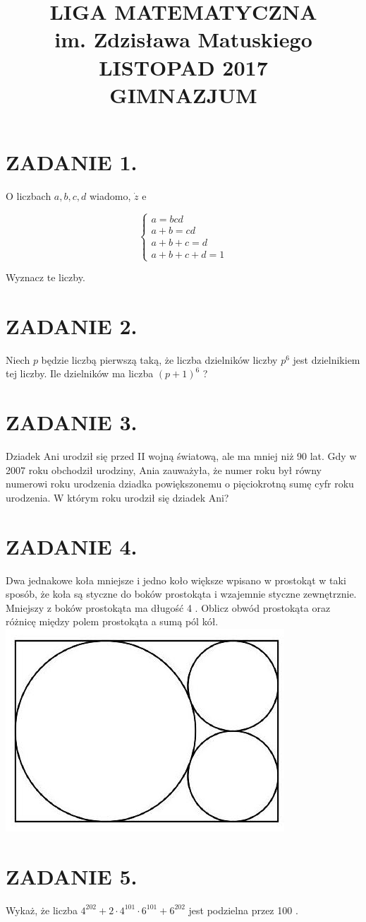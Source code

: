 \documentclass[10pt]{article}
\title{LIGA MATEMATYCZNA \\
 im. Zdzisława Matuskiego \\
 LISTOPAD 2017 \\
 GIMNAZJUM }
\author{}
\date{}
\begin{document}
\maketitle
\section*{ZADANIE 1.}
O liczbach \(a, b, c, d\) wiadomo, \(\dot{z}\) e

\[
\left\{\begin{array}{l}
a=b c d \\
a+b=c d \\
a+b+c=d \\
a+b+c+d=1
\end{array}\right.
\]

Wyznacz te liczby.

\section*{ZADANIE 2.}
Niech \(p\) będzie liczbą pierwszą taką, że liczba dzielników liczby \(p^{6}\) jest dzielnikiem tej liczby. Ile dzielników ma liczba \((p+1)^{6}\) ?

\section*{ZADANIE 3.}
Dziadek Ani urodził się przed II wojną światową, ale ma mniej niż 90 lat. Gdy w 2007 roku obchodził urodziny, Ania zauważyła, że numer roku był równy numerowi roku urodzenia dziadka powiększonemu o pięciokrotną sumę cyfr roku urodzenia. W którym roku urodził się dziadek Ani?

\section*{ZADANIE 4.}
Dwa jednakowe koła mniejsze i jedno koło większe wpisano w prostokąt w taki sposób, że koła są styczne do boków prostokąta i wzajemnie styczne zewnętrznie. Mniejszy z boków prostokąta ma długość 4 . Oblicz obwód prostokąta oraz różnicę między polem prostokąta a sumą pól kół.\\
\includegraphics[max width=\textwidth, center]{2024_11_21_7bef91178e532250cdc3g-1}

\section*{ZADANIE 5.}
Wykaż, że liczba \(4^{202}+2 \cdot 4^{101} \cdot 6^{101}+6^{202}\) jest podzielna przez 100 .
\end{document}
